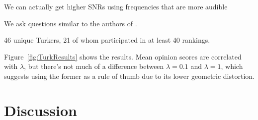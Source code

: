\documentclass[runningheads]{llncs}
\begin{document}
We can actually get higher SNRs using frequencies that are more audible

We ask questions similar to the authors of \cite{bassia2001robust}.

46 unique Turkers, 21 of whom participated in at least 40 rankings.

Figure~\ref{fig:TurkResults} shows the results.  Mean opinion scores are correlated with $\lambda$, but there's not much of a difference between $\lambda=0.1$ and $\lambda=1$, which suggests using the former as a rule of thumb due to its lower geometric distortion.

\section{Discussion}

%
%
%


%
\end{document}
